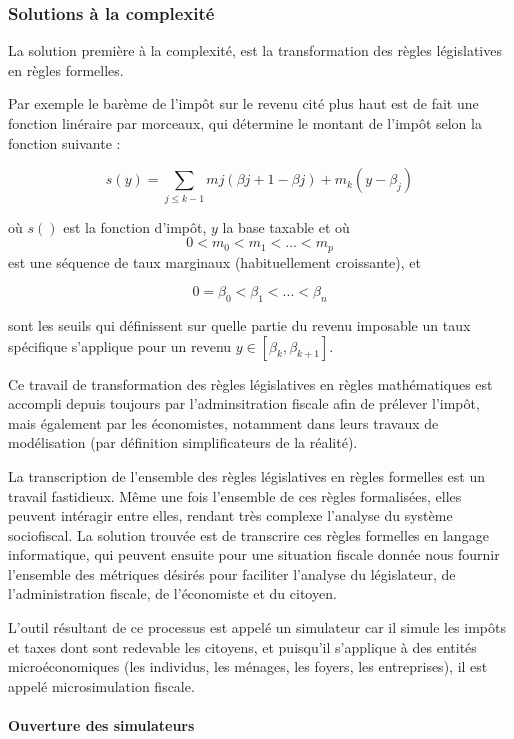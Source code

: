 \subsubsection{Solutions à la
complexité}

La solution première à la complexité, est la transformation des règles
législatives en règles formelles.

Par exemple le barème de l'impôt sur le revenu cité plus haut est de
fait une fonction linéraire par morceaux, qui détermine le montant de
l'impôt selon la fonction suivante :

\[s(y)=   \sum_{j \leq k-1} mj(\beta{j+1} − \beta{j})+m_k(y−\beta_j)\]

où \(s()\) est la fonction d'impôt, \(y\) la base taxable et où
\[0<m_0 <m_1 <...<m_p\] est une séquence de taux marginaux
(habituellement croissante), et

\[0= \beta_0<\beta_1< ... < \beta_n  \]

sont les seuils qui définissent sur quelle partie du revenu imposable un
taux spécifique s'applique pour un revenu
\(y\in [\beta_k,\beta_{k+1}]\).

Ce travail de transformation des règles législatives en règles
mathématiques est accompli depuis toujours par l'adminsitration fiscale
afin de prélever l'impôt, mais également par les économistes, notamment
dans leurs travaux de modélisation (par définition simplificateurs de la
réalité).

La transcription de l'ensemble des règles législatives en règles
formelles est un travail fastidieux. Même une fois l'ensemble de ces
règles formalisées, elles peuvent intéragir entre elles, rendant très
complexe l'analyse du système sociofiscal. La solution trouvée est de
transcrire ces règles formelles en langage informatique, qui peuvent
ensuite pour une situation fiscale donnée nous fournir l'ensemble des
métriques désirés pour faciliter l'analyse du législateur, de
l'administration fiscale, de l'économiste et du citoyen.

L'outil résultant de ce processus est appelé un simulateur car il simule
les impôts et taxes dont sont redevable les citoyens, et puisqu'il
s'applique à des entités microéconomiques (les individus, les ménages,
les foyers, les entreprises), il est appelé microsimulation fiscale.

\hypertarget{ouverture-des-simulateurs}{%
\paragraph{Ouverture des simulateurs}\label{ouverture-des-simulateurs}}


